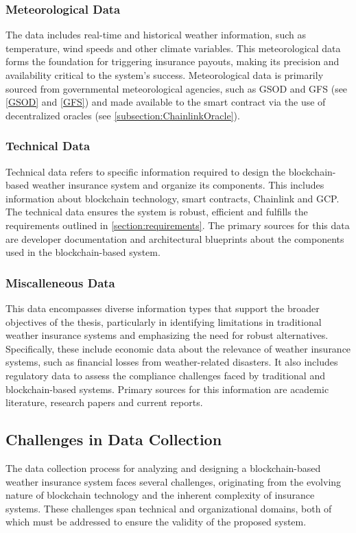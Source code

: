 \subsubsection{Meteorological Data}
The data includes real-time and historical weather information, such as temperature, wind speeds and other climate variables. This meteorological data forms the foundation for triggering insurance payouts, making its precision and availability critical to the system's success. Meteorological data is primarily sourced from governmental meteorological agencies, such as GSOD and GFS (see \cref{GSOD} and \cref{GFS}) and made available to the smart contract via the use of decentralized oracles (see \cref{subsection:ChainlinkOracle}).

\subsubsection{Technical Data}
Technical data refers to specific information required to design the blockchain-based weather insurance system and organize its components. This includes information about blockchain technology, smart contracts, Chainlink and GCP. The technical data ensures the system is robust, efficient and fulfills the requirements outlined in \cref{section:requirements}. The primary sources for this data are developer documentation and architectural blueprints about the components used in the blockchain-based system.

\subsubsection{Miscalleneous Data}
This data encompasses diverse information types that support the broader objectives of the thesis, particularly in identifying limitations in traditional weather insurance systems and emphasizing the need for robust alternatives. Specifically, these include economic data about the relevance of weather insurance systems, such as financial losses from weather-related disasters. It also includes regulatory data to assess the compliance challenges faced by traditional and blockchain-based systems. Primary sources for this information are academic literature, research papers and current reports.

\subsection{Challenges in Data Collection}
The data collection process for analyzing and designing a blockchain-based weather insurance system faces several challenges, originating from the evolving nature of blockchain technology and the inherent complexity of insurance systems. These challenges span technical and organizational domains, both of which must be addressed to ensure the validity of the proposed system.

